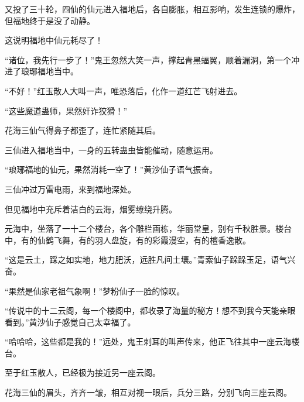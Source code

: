 \begin{this_body}
又投了三十轮，四仙的仙元进入福地后，各自膨胀，相互影响，发生连锁的爆炸，但福地终于是没了动静。

这说明福地中仙元耗尽了！

“诸位，我先行一步了！”鬼王忽然大笑一声，撑起青黑蝠翼，顺着漏洞，第一个冲进了琅琊福地当中。

“不好！”红玉散人大叫一声，唯恐落后，化作一道红芒飞射进去。

“这些魔道蛊师，果然奸诈狡猾！”

花海三仙气得鼻子都歪了，连忙紧随其后。

三仙进入福地当中，一身的五转蛊虫皆能催动，随意运用。

“琅琊福地的仙元，果然消耗一空了！”黄沙仙子语气振奋。

三仙冲过万雷电雨，来到福地深处。

但见福地中充斥着洁白的云海，烟雾缭绕升腾。

元海中，坐落了一十二个楼台，各个雕栏画栋，华丽堂皇，别有千秋胜景。楼台中，有的仙鹤飞舞，有的羽人盘旋，有的彩霞漫空，有的檀香逸散。

“这是云土，踩之如实地，地力肥沃，远胜凡间土壤。”青索仙子跺跺玉足，语气兴奋。

“果然是仙家老祖气象啊！”梦粉仙子一脸的惊叹。

“传说中的十二云阁，每一个楼阁中，都收录了海量的秘方！想不到我今天能亲眼看到。”黄沙仙子感觉自己太幸福了。

“哈哈哈，这些都是我的！”远处，鬼王刺耳的叫声传来，他正飞往其中一座云海楼台。

至于红玉散人，已经极为接近另一座云阁。

花海三仙的眉头，齐齐一皱，相互对视一眼后，兵分三路，分别飞向三座云阁。

\end{this_body}

